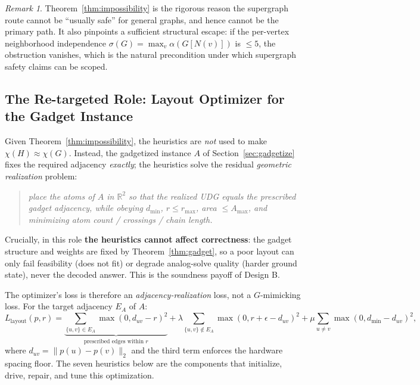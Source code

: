 \documentclass[11pt]{article}
\theoremstyle{definition}
\theoremstyle{remark}
\newtheorem{remark}[theorem]{Remark}
\newcommand{\R}{\mathbb{R}}
\newcommand{\indep}{\alpha}
\begin{document}
\begin{remark}
Theorem~\ref{thm:impossibility} is the rigorous reason the supergraph route cannot
be ``usually safe'' for general graphs, and hence cannot be the primary path. It
also pinpoints a sufficient structural escape: if the per-vertex neighborhood
independence $\sigma(G)=\max_v \indep(G[N(v)])$ is $\le 5$, the obstruction
vanishes, which is the natural precondition under which supergraph safety claims
can be scoped.
\end{remark}

\subsection{The Re-targeted Role: Layout Optimizer for the Gadget Instance}
\label{sec:layoutrole}

Given Theorem~\ref{thm:impossibility}, the heuristics are \emph{not} used to make
$\chi(H)\approx\chi(G)$. Instead, the gadgetized instance $A$ of
Section~\ref{sec:gadgetize} fixes the required adjacency \emph{exactly}; the
heuristics solve the residual \emph{geometric realization} problem:

\begin{quote}\itshape
place the atoms of $A$ in $\R^2$ so that the realized UDG equals the prescribed
gadget adjacency, while obeying $d_{\min}$, $r\le r_{\max}$, area $\le A_{\max}$,
and minimizing atom count / crossings / chain length.
\end{quote}

Crucially, in this role \textbf{the heuristics cannot affect correctness}: the
gadget structure and weights are fixed by Theorem~\ref{thm:gadget}, so a poor
layout can only fail feasibility (does not fit) or degrade analog-solve quality
(harder ground state), never the decoded answer. This is the soundness payoff of
Design B.

The optimizer's loss is therefore an \emph{adjacency-realization} loss, not a
$G$-mimicking loss. For the target adjacency $E_A$ of $A$:
\begin{equation}
\label{eq:layoutloss}
  L_{\mathrm{layout}}(p,r) =
  \underbrace{\sum_{\{u,v\}\in E_A}\!\!\max(0,d_{uv}-r)^2}_{\text{prescribed edges within }r}
  + \lambda\!\!\sum_{\{u,v\}\notin E_A}\!\!\max(0,r+\epsilon-d_{uv})^2
  + \mu\!\sum_{u\ne v}\max(0,d_{\min}-d_{uv})^2,
\end{equation}
where $d_{uv}=\|p(u)-p(v)\|_2$ and the third term enforces the hardware spacing
floor. The seven heuristics below are the components that initialize, drive,
repair, and tune this optimization.
\end{document}
